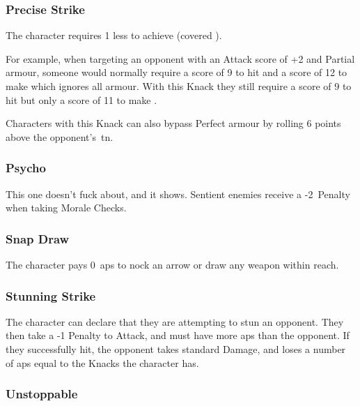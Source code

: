 \begin{multicols}{2}
\subsubsection{Precise Strike}\label{precisestrike}

The character requires 1 less to achieve  (covered ).

\begin{exampletext}
  For example, when targeting an opponent with an Attack score of +2 and Partial armour, someone would normally require a score of 9 to hit and a score of 12 to make  which ignores all armour.
  With this Knack they still require a score of 9 to hit but only a score of 11 to make .
\end{exampletext}

Characters with this Knack can also bypass Perfect armour by rolling 6 points above the opponent's~\gls{tn}.

\subsubsection{Psycho}

This one doesn't fuck about, and it shows.
Sentient enemies receive a -2~Penalty when taking Morale Checks.%

\subsubsection{Snap Draw}

The character pays 0~\glspl{ap} to nock an arrow or draw any \gls{weapon} within reach.

\subsubsection{Stunning Strike}\label{stunningstrike}

The character can declare that they are attempting to stun an opponent.
They then take a -1 Penalty to Attack, and must have more \glspl{ap} than the opponent.
If they successfully hit, the opponent takes standard Damage, and loses a number of \glspl{ap} equal to the Knacks the character has.

\subsubsection{Unstoppable}


\end{multicols}
